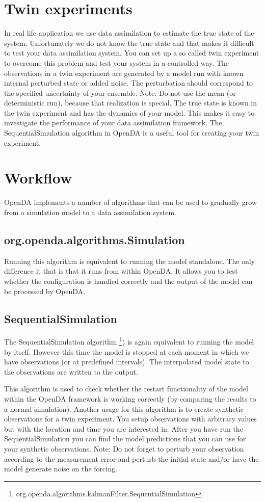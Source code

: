 \section{Twin experiments} \label{Sec:Twin}
In real life application we use data assimilation to estimate the true state of the system. Unfortunately we do not know the true state and that makes it difficult to test your data assimilation system. You can set up a so called twin experiment to overcome this problem and test your system in a controlled way. The observations in a twin experiment are generated by a model run with known internal perturbed state or added noise. The perturbation should correspond to the specified uncertainty of your ensemble. Note: Do not use the mean (or deterministic run), because that realization is special. The true state is known in the twin experiment and has the dynamics of your model. This makes it easy to investigate the performance of your data assimilation framework. The SequentialSimulation algorithm in OpenDA is a useful tool for creating your twin experiment.


\section{Workflow}
OpenDA implements a number of algorithms that can be used to gradually grow from a simulation model to a data assimilation system.
\subsection{org.openda.algorithms.Simulation}
Running this algorithm is equivalent to running the model standalone. The only difference it that is that it runs from within OpenDA. It allows you to test whether the configuration is handled correctly and the output of the model can be processed by OpenDA. 

\subsection{SequentialSimulation}
The SequentialSimulation algorithm \footnote{org.openda.algorithms.kalmanFilter.SequentialSimulation}) is again equivalent to running the model by itself. However this time the model is stopped at each moment in which we have observations (or at predefined intervals).  The interpolated model state to the observations are written to the output. 

This algorithm is used to check whether the restart functionality of the model within the OpenDA framework is working correctly (by comparing the results to a normal simulation). Another usage for this algorithm is to create synthetic observations for a twin experiment. You setup observations with arbitrary values but with the location and time you are interested in. After you have run the SequentialSimulation you can find the model predictions that you can use for your synthetic observations. Note: Do not forget to perturb your observation according to the measurement error and perturb the initial state and/or have the model generate noise on the forcing.

